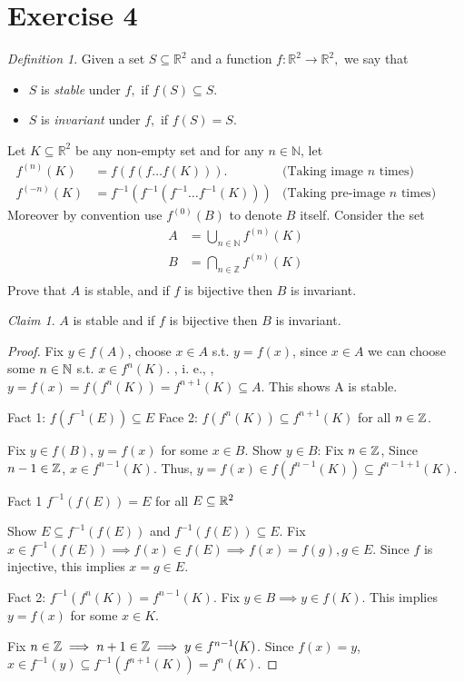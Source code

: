 \documentclass{homework}
\theoremstyle{remark}
\newtheorem*{claim}{Claim}
\newtheorem*{definition}{Definition}
\newcommand*{\ie}{\leavevmode\unskip, i. e., \ignorespaces}
\newcommand{\R}{\bb{R}} %
\newcommand{\Z}{\bb{Z}} %
\newcommand{\N}{\bb{N}} %
\newcommand{\?}{\stackrel{?}{=}}
\begin{document}
\section*{Exercise 4}
\begin{definition}
    Given a set $S\subseteq \mathbb{R}^2$ and a function $f:\mathbb{R}^2\rightarrow\mathbb{R}^2,$ we say that 
    \begin{itemize}
        \item $S$ is \textit{stable} under $f,$ if $f(S)\subseteq S.$
        \item $S$ is \textit{invariant} under $f,$ if $f(S)=S.$ 
    \end{itemize}
\end{definition}
\question Let $K\subseteq \mathbb{R}^2$ be any non-empty set and for any $n\in\mathbb{N}$, let \begin{align*}
    f^{(n)}(K)&=f(f(f\ldots f(K))). &\text{(Taking image $n$ times)}&& \\
    f^{(-n)}(K)&=f^{-1}(f^{-1}(f^{-1}\ldots f^{-1}(K))) &\text{(Taking pre-image $n$ times)} &&
\end{align*} 
Moreover by convention use $f^{(0)}(B)$ to denote $B$ itself. Consider the set \begin{align*}
    A&=\bigcup_{n\in\mathbb{N}}f^{(n)}(K)\\
    B&=\bigcap_{n\in\mathbb{Z}}f^{(n)}(K)\\
\end{align*}
Prove that $A$ is stable, and if $f$ is bijective then $B$ is invariant. 
\begin{claim}
    $A$ is stable and if $f$ is bijective then $B$ is invariant. 
\end{claim}
\begin{proof}
    Fix $y\in f(A)$, choose $x\in A$ s.t. $y=f(x)$, since $x\in A$ we can choose some $n\in\N$ s.t. $x\in f^n(K)$. \ie, $y=f(x)=f(f^n(K))=f^{n+1}(K)\subseteq A$. This shows A is stable.

    Fact 1: $f(f^{-1}(E))\subseteq E$
    Face 2: $f(f^n(K))\subseteq f^{n+1}(K)$ for all $n\in \Z$. 

    Fix $y\in f(B)$, $y=f(x)$ for some $x\in B$. Show $y\in B$: Fix $n\in \Z$, Since $n-1\in \Z$, $x\in f^{n-1}(K)$. Thus, $y=f(x)\in f(f^{n-1}(K))\subseteq f^{n-1+1}(K)$. 

    Fact 1 $f^{-1}(f(E))=E$ for all $E\subseteq \R^2$

    Show $E\subseteq f^{-1}(f(E))$ and $f^{-1}(f(E))\subseteq E$. Fix $x\in f^{-1}(f(E))\implies f(x)\in f(E)\implies f(x)=f(g), g\in E$. Since $f$ is injective, this implies $x=g\in E$. 

    Fact 2: $f^{-1}(f^n(K))=f^{n-1}(K)$. Fix $y\in B\implies y\in f(K)$. This implies $y=f(x)$ for some $x\in K$. 

    Fix $n\in \Z\implies n+1\in \Z\implies y\in f^{n-1}(K)$. Since $f(x)=y$, $x\in f^{-1}(y)\subseteq f^{-1}(f^{n+1}(K))=f^n(K)$. 
\end{proof}
\end{document}
